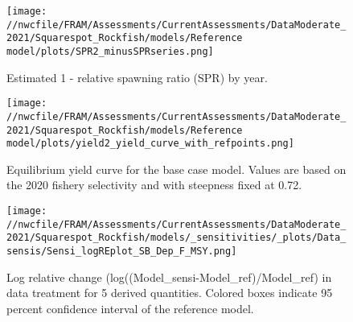 \documentclass[11pt,
  english,
  a4paper,
]{article}
\begin{document}
\tagmcend\tagstructend


\begin{figure}
\centering
\texttt{[image: //nwcfile/FRAM/Assessments/CurrentAssessments/DataModerate\_2021/Squarespot\_Rockfish/models/Reference model/plots/SPR2\_minusSPRseries.png]}
\caption{Estimated 1 - relative spawning ratio (SPR) by year.\label{fig:1-spr}}
\end{figure}

\tagmcend\tagstructend


\begin{figure}
\centering
\texttt{[image: //nwcfile/FRAM/Assessments/CurrentAssessments/DataModerate\_2021/Squarespot\_Rockfish/models/Reference model/plots/yield2\_yield\_curve\_with\_refpoints.png]}
\caption{Equilibrium yield curve for the base case model. Values are based on the 2020 fishery selectivity and with steepness fixed at 0.72.\label{fig:yield}}
\end{figure}

\tagmcend\tagstructend


\begin{figure}
\centering
\texttt{[image: //nwcfile/FRAM/Assessments/CurrentAssessments/DataModerate\_2021/Squarespot\_Rockfish/models/\_sensitivities/\_plots/Data\_sensis/Sensi\_logREplot\_SB\_Dep\_F\_MSY.png]}
\caption{Log relative change (log((Model\_sensi-Model\_ref)/Model\_ref) in data treatment for 5 derived quantities. Colored boxes indicate 95 percent confidence interval of the reference model.\label{fig:sensi-data-RE}}
\end{figure}

\tagmcend\tagstructend

\end{document}
